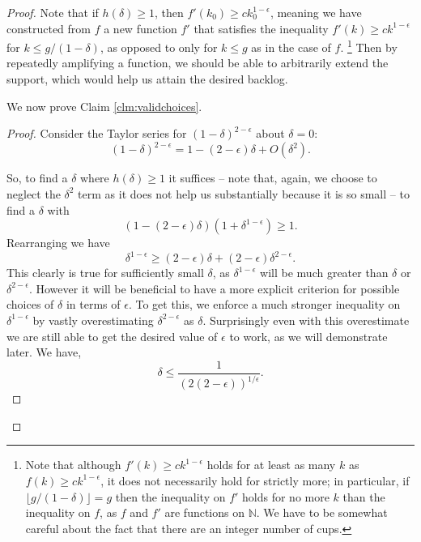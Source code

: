 \documentclass[twocolumn]{article}[10pt]
\begin{document}
\begin{proof}
  Note that if $h(\delta)\ge 1$, then $f'(k_0) \ge c k_0^{1-\epsilon}$, meaning
  we have constructed from $f$ a new function $f'$ that satisfies the
  inequality $f'(k) \ge ck^{1-\epsilon}$ for $k\le g/(1-\delta)$, as opposed to
  only for $k \le g$ as in the case of $f$. 
  \footnote{Note that although $f'(k) \ge ck^{1-\epsilon}$ holds for at least as many $k$
    as $f(k) \ge c k^{1-\epsilon}$, it does not necessarily hold for strictly
    more; in particular, if $\lfloor g/(1-\delta) \rfloor = g$ then the inequality on
    $f'$ holds for no more $k$ than the inequality on $f$, as $f$ and $f'$ are
    functions on $\mathbb{N}$. We have to be somewhat careful about the fact that
    there are an integer number of cups.} 
  Then by repeatedly amplifying a function, we should be able to arbitrarily
  extend the support, which would help us attain the desired backlog.

  We now prove Claim \ref{clm:validchoices}.
  \begin{proof}
  Consider the Taylor series for $(1-\delta)^{2-\epsilon}$ about $\delta = 0$:
  $$(1-\delta)^{2-\epsilon} = 1 - (2-\epsilon)\delta + O(\delta^2).$$
 
  So, to find a $\delta$ where $h(\delta) \ge 1$ it suffices -- note that, again, we choose
  to neglect the $\delta^2$ term as it does not help us substantially because
  it is so small -- to find a $\delta$ with 
  $$(1-(2-\epsilon)\delta)(1+\delta^{1-\epsilon}) \ge 1.$$
  Rearranging we have 
  $$\delta^{1-\epsilon} \ge (2-\epsilon)\delta + (2-\epsilon)\delta^{2-\epsilon}.$$
  This clearly is true for sufficiently small $\delta$, as
  $\delta^{1-\epsilon}$ will be much greater than $\delta$ or
  $\delta^{2-\epsilon}$.
  However it will be beneficial to have a more explicit criterion for possible
  choices of $\delta$ in terms of $\epsilon$. To get this, we enforce a much
  stronger inequality on $\delta^{1-\epsilon}$ by vastly overestimating
  $\delta^{2-\epsilon}$ as $\delta$. Surprisingly even with this overestimate
  we are still able to get the desired value of $\epsilon$ to work, as we will demonstrate later.
  We have,
  \begin{equation}
    \label{eqn:deltaUpperIneq}
    \delta \le \frac{1}{(2(2-\epsilon))^{1/\epsilon}}. 
  \end{equation}


\end{proof}
\end{proof}
\end{document}
